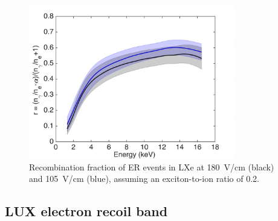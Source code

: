 \begin{figure}[t!]
\includegraphics[width=90mm]{fig/fig10.pdf}
\caption{Recombination fraction of ER events in LXe at 180~V/cm (black) and 105~V/cm (blue), assuming an exciton-to-ion ratio of 0.2.}
\label{fig:recombination}
\end{figure}

\subsection{LUX electron recoil band}


